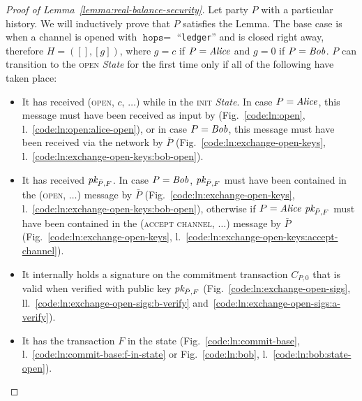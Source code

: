 \begin{proof}[Proof of Lemma~\ref{lemma:real-balance-security}]
  Let party $P$ with a particular history. We will inductively prove that $P$
  satisfies the Lemma. The base case is when a channel is opened with
  $\texttt{hops} =$ ``\texttt{ledger}'' and is closed right away, therefore $H = ([], [g])$,
  where $g = c$ if $P = \mathit{Alice}$ and $g = 0$ if $P = \mathit{Bob}$.  $P$ can transition
  to the \textsc{open} \textit{State} for the first time only if all of the
  following have taken place:
  \begin{itemize}
    \item It has received (\textsc{open}, $c$, $\dots$) while in the
    \textsc{init} \textit{State}. In case $P = \mathit{Alice}$, this message must have
    been received as input by \environment (Fig.~\ref{code:ln:open},
    l.~\ref{code:ln:open:alice-open}), or in case $P = \mathit{Bob}$, this message must
    have been received via the network by $\bar{P}$
    (Fig.~\ref{code:ln:exchange-open-keys},
    l.~\ref{code:ln:exchange-open-keys:bob-open}).
    \item It has received $\textit{pk}_{\bar{P}, F}$. In case $P = \mathit{Bob}$, $\textit{pk}_{\bar{P},
    F}$ must have been contained in the (\textsc{open}, $\dots$) message by
    $\bar{P}$ (Fig.~\ref{code:ln:exchange-open-keys},
    l.~\ref{code:ln:exchange-open-keys:bob-open}), otherwise if $P = \mathit{Alice}$
    $\textit{pk}_{\bar{P}, F}$ must have been contained in the (\textsc{accept channel},
    $\dots$) message by $\bar{P}$ (Fig.~\ref{code:ln:exchange-open-keys},
    l.~\ref{code:ln:exchange-open-keys:accept-channel}).
    \item It internally holds a signature on the commitment transaction $C_{P,
    0}$ that is valid when verified with public key $\textit{pk}_{\bar{P}, F}$
    (Fig.~\ref{code:ln:exchange-open-sigs},
    ll.~\ref{code:ln:exchange-open-sigs:b-verify}
    and~\ref{code:ln:exchange-open-sigs:a-verify}).
    \item It has the transaction $F$ in the \ledger state
    (Fig.~\ref{code:ln:commit-base}, l.~\ref{code:ln:commit-base:f-in-state} or
    Fig.~\ref{code:ln:bob}, l.~\ref{code:ln:bob:state-open}).
  \end{itemize}


\end{proof}
